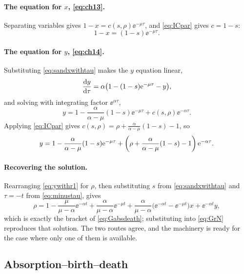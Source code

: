 \paragraph{The equation for $x$, \cref{eq:ch13}.}
Separating variables gives $1-x = c(s,\rho)\ee^{-\mu\tau}$, and \cref{eq:ICpar} gives
$c = 1-s$:
\begin{equation}
\label{eq:sandxwithtau}
1-x = (1-s)\ee^{-\mu\tau} .
\end{equation}

\paragraph{The equation for $y$, \cref{eq:ch14}.}
Substituting \cref{eq:sandxwithtau} makes the $y$ equation linear,
\begin{equation*}
\displaystyle\frac{{\rm d} y}{{\rm d} \tau} = \alpha\bigl(1-(1-s){\rm e}^{-\mu\tau} - y\bigr),
\end{equation*}
and solving with integrating factor $\ee^{\alpha\tau}$,
\begin{equation*}
y = 1 - \frac{\alpha}{\alpha-\mu}(1-s)\ee^{-\mu\tau} + c(s,\rho)\ee^{-\alpha\tau} .
\end{equation*}
Applying \cref{eq:ICpar} gives $c(s,\rho) = \rho + \frac{\alpha}{\alpha-\mu}(1-s) - 1$, so
\begin{equation}
\label{eq:ywithr1}
y = 1 - \frac{\alpha}{\alpha-\mu}(1-s){\rm e}^{-\mu\tau}
+ \left(\rho + \frac{\alpha}{\alpha-\mu}(1-s) - 1\right){\rm e}^{-\alpha\tau} .
\end{equation}

\paragraph{Recovering the solution.}
Rearranging \cref{eq:ywithr1} for $\rho$, then substituting $s$ from
\cref{eq:sandxwithtau} and $\tau=-t$ from \cref{eq:minustau}, gives
\begin{equation*}
\rho = 1-\frac{\mu}{\mu-\alpha}\ee^{-\alpha t} + \frac{\alpha}{\mu-\alpha}\ee^{-\mu t}
+ \frac{\alpha}{\mu-\alpha}\bigl(\ee^{-\alpha t}-\ee^{-\mu t}\bigr)x + \ee^{-\alpha t}y ,
\end{equation*}
which is exactly the bracket of \cref{eq:Gabsdeath}; substituting into \cref{eq:GrN}
reproduces that solution. The two routes agree, and the machinery is ready for the case
where only one of them is available.

\subsection{Absorption--birth--death}
\label{sec:absbirthdeath}

